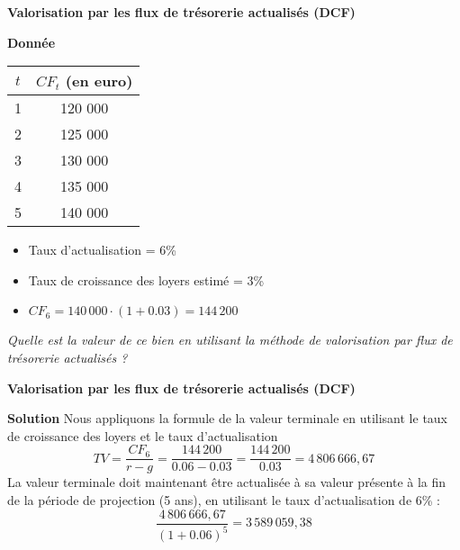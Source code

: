 \documentclass{beamer}
\begin{document}
\begin{frame}{\textbf{Valorisation par les flux de trésorerie actualisés (DCF)}}
	\begin{exampleblock}{\textbf{Donnée}}
		\begin{center}
			\begin{tabular}{@{}cc@{}}
				\toprule
				\( t \) & \( CF_t\) (en euro)\\ \midrule
				1   & 120 000                   \\
				2   & 125 000                   \\
				3   & 130 000                   \\
				4   & 135 000                   \\
				5   & 140 000                   \\ \bottomrule
			\end{tabular}
		\end{center}
		
\begin{itemize}
	\item Taux d'actualisation = 6\%
	\item Taux de croissance des loyers estimé = 3\%
	\item \( CF_6 = 140\,000 \cdot (1+0.03)=144\,200 \)
\end{itemize}
		
\textit{Quelle est la valeur de ce bien en utilisant la méthode de valorisation par flux de trésorerie actualisés ?}
\end{exampleblock}
\end{frame}

\begin{frame}{\textbf{Valorisation par les flux de trésorerie actualisés (DCF)}}

\begin{exampleblock}{\textbf{Solution}}
Nous appliquons la formule de la valeur terminale en utilisant le taux de croissance des loyers et le taux d'actualisation
\[ TV = \frac{CF_6}{r-g}=\frac{144\,200}{0.06-0.03}=\frac{144\,200}{0.03}=4\,806\,666,67\]
La valeur terminale doit maintenant être actualisée à sa valeur présente à la fin de la période de projection (5 ans), en utilisant le taux d'actualisation de 6\% :
\[ \frac{4\,806\,666,67}{(1+0.06)^5} = 3\,589\,059,38\]

\end{exampleblock}


\end{frame}
\end{document}
